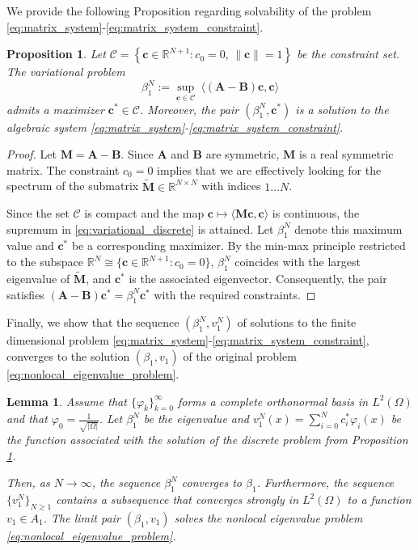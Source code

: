 \documentclass[11pt, a4paper]{article}
\theoremstyle{break}
\theoremstyle{break}
\newtheorem{prp}{Proposition}[section]
\theoremstyle{break}
\theoremstyle{break}
\theoremstyle{break}
\newtheorem{lem}{Lemma}[section]
\theoremstyle{break}
\theoremstyle{break}
\theoremstyle{break}
\theoremstyle{break}
\theoremstyle{break}
\begin{document}
We provide the following Proposition regarding solvability of the problem \eqref{eq:matrix_system}-\eqref{eq:matrix_system_constraint}.
\begin{prp}
    \label{prp:finite_dimensional_minimizer}
    Let $\mathcal{C} = \left\{ \mathbf{c} \in \mathbb{R}^{N+1} : c_0 = 0, \, \|\mathbf{c}\| = 1 \right\}$ be the constraint set. 
    The variational problem
    \begin{equation}
        \label{eq:variational_discrete}
        \beta_1^N := \sup_{\mathbf{c} \in \mathcal{C}} \: \langle (\mathbf{A} - \mathbf{B}) \mathbf{c}, \mathbf{c} \rangle
    \end{equation}
    admits a maximizer $\mathbf{c}^* \in \mathcal{C}$. Moreover, the pair $(\beta_1^N, \mathbf{c}^*)$ is a solution to the algebraic system \eqref{eq:matrix_system}-\eqref{eq:matrix_system_constraint}.
\end{prp}

\begin{proof}
    Let $\mathbf{M} = \mathbf{A} - \mathbf{B}$. Since $\mathbf{A}$ and $\mathbf{B}$ are symmetric, $\mathbf{M}$ is a real symmetric matrix. The constraint $c_0=0$ implies that we are effectively looking for the spectrum of the submatrix $\tilde{\mathbf{M}} \in \mathbb{R}^{N \times N}$ with indices $1 \dots N$.
    
    Since the set $\mathcal{C}$ is compact and the map $\mathbf{c} \mapsto \langle \mathbf{M}\mathbf{c}, \mathbf{c}\rangle$ is continuous, the supremum in \eqref{eq:variational_discrete} is attained. Let $\beta_1^N$ denote this maximum value and $\mathbf{c}^*$ be a corresponding maximizer. By the min-max principle restricted to the subspace $\mathbb{R}^N \cong \{ \mathbf{c} \in \mathbb{R}^{N+1} : c_0=0 \}$, $\beta_1^N$ coincides with the largest eigenvalue of $\tilde{\mathbf{M}}$, and $\mathbf{c}^*$ is the associated eigenvector. Consequently, the pair satisfies $(\mathbf{A}-\mathbf{B})\mathbf{c}^* = \beta_1^N \mathbf{c}^*$ with the required constraints.
\end{proof}

Finally, we show that the sequence $(\beta_1^N, v_1^N)$ of solutions to the finite dimensional problem \eqref{eq:matrix_system}-\eqref{eq:matrix_system_constraint}, converges to the solution $(\beta_1, v_1)$ of the original problem \eqref{eq:nonlocal_eigenvalue_problem}.

\begin{lem}
    \label{thm:convergence}
    Assume that $\{\varphi_k\}_{k=0}^\infty$ forms a complete orthonormal basis in $L^2(\Omega)$ and that $\varphi_0 = \frac{1}{\sqrt{|\Omega|}}$. Let $\beta_1^N$ be the eigenvalue and $v_1^N(x) = \sum_{i=0}^N c^*_i \varphi_i(x)$ be the function associated with the solution of the discrete problem from Proposition \ref{prp:finite_dimensional_minimizer}. 
    
    Then, as $N \to \infty$, the sequence $\beta_1^N$ converges to $\beta_1$. Furthermore, the sequence $\{v_1^N\}_{N \geq 1}$ contains a subsequence that converges strongly in $L^2(\Omega)$ to a function $v_1 \in A_1$. The limit pair $(\beta_1, v_1)$ solves the nonlocal eigenvalue problem \eqref{eq:nonlocal_eigenvalue_problem}.
\end{lem}
\end{document}
